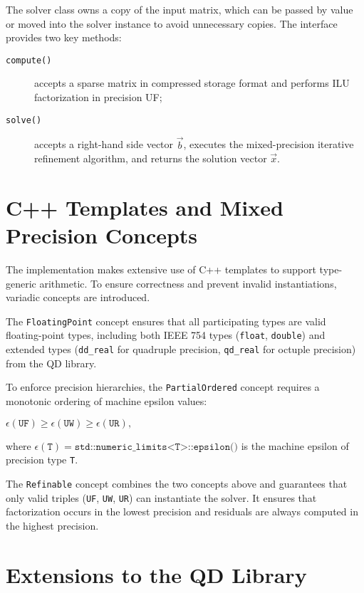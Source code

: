The solver class owns a copy of the input matrix, which can be passed by value
or moved into the solver instance to avoid unnecessary copies. The interface
provides two key methods:
\begin{description}
\item[\texttt{compute()}] accepts a sparse matrix in compressed storage format and performs
  ILU factorization in precision UF;
\item[\texttt{solve()}] accepts a right-hand side vector \(\vec{b}\), executes the
  mixed-precision iterative refinement algorithm, and returns the solution
  vector \(\vec{x}\).
\end{description}

\section{C++ Templates and Mixed Precision Concepts}
\label{sec:c++-templates-mixed}

The implementation makes extensive use of C++ templates to support type-generic
arithmetic. To ensure correctness and prevent invalid instantiations, variadic
concepts are introduced.

The \texttt{FloatingPoint} concept ensures that all participating types are valid
floating-point types, including both IEEE 754 types (\texttt{float},
\texttt{double}) and extended types (\texttt{dd\_real} for quadruple precision,
\texttt{qd\_real} for octuple precision) from the QD
\cite{david_bailey_bl-highprecisionqd_2025} library.

To enforce precision hierarchies, the \texttt{PartialOrdered} concept requires a
monotonic ordering of machine epsilon values:
\begin{center}
  \(\epsilon(\texttt{UF}) \ge \epsilon(\texttt{UW}) \ge \epsilon(\texttt{UR}),\)
\end{center}
where \(\epsilon(\texttt{T}) = \texttt{std::numeric\_limits<T>::epsilon()}\) is the machine
epsilon of precision type \texttt{T}.

The \texttt{Refinable} concept combines the two concepts above and guarantees that
only valid triples (\texttt{UF}, \texttt{UW}, \texttt{UR}) can instantiate the
solver. It ensures that factorization occurs in the lowest precision and
residuals are always computed in the highest precision.

\section{Extensions to the QD Library}
\label{sec:extens-qd-libr}

